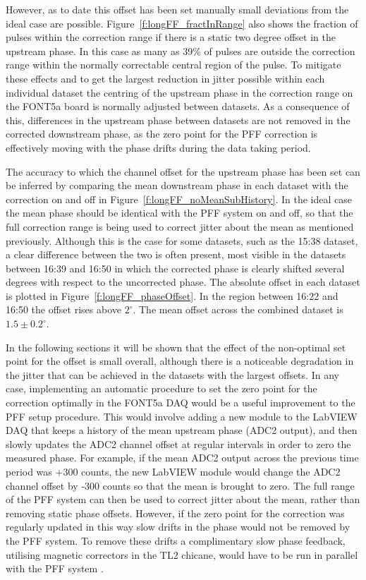 However, as to date this offset has been set manually small deviations from the ideal case are possible. Figure~\ref{f:longFF_fractInRange} also shows the fraction of pulses within the correction range if there is a static two degree offset in the upstream phase. In this case as many as 39\% of pulses are outside the correction range within the normally correctable central region of the pulse. To mitigate these effects and to get the largest reduction in jitter possible within each individual dataset the centring of the upstream phase in the correction range on the FONT5a board is normally adjusted between datasets. As a consequence of this, differences in the upstream phase between datasets are not removed in the corrected downstream phase, as the zero point for the PFF correction is effectively moving with the phase drifts during the data taking period. %

The accuracy to which the channel offset for the upstream phase has been set can be inferred by comparing the mean downstream phase in each dataset with the correction on  and off in Figure~\ref{f:longFF_noMeanSubHistory}. In the ideal case the mean phase should be identical with the PFF system on and off, so that the full correction range is being used to correct jitter about the mean as mentioned previously. Although this is the case for some datasets, such as the 15:38 dataset, a clear difference between the two is often present, most visible in the datasets between 16:39 and 16:50 in which the corrected phase is clearly shifted several degrees with respect to the uncorrected phase. The absolute offset in each dataset is plotted in Figure~\ref{f:longFF_phaseOffset}. In the region between 16:22 and 16:50 the offset rises above \(2^\circ\). The mean offset across the combined dataset is \(1.5\pm0.2^\circ\). 

In the following sections it will be shown that the effect of the non-optimal set point for the offset is small overall, although there is a noticeable degradation in the jitter that can be achieved in the datasets with the largest offsets. In any case, implementing an automatic procedure to set the zero point for the correction optimally in the FONT5a DAQ would be a useful improvement to the PFF setup procedure. This would involve adding a new module to the LabVIEW DAQ that keeps a history of the mean upstream phase (ADC2 output), and then slowly updates the ADC2 channel offset at regular intervals in order to zero the measured phase. For example, if the mean ADC2 output across the previous time period was +300 counts, the new LabVIEW module would change the ADC2 channel offset by -300 counts so that the mean is brought to zero. The full range of the PFF system can then be used to correct jitter about the mean, rather than removing static phase offsets. However, if the zero point for the correction was regularly updated in this way slow drifts in the phase would not be removed by the PFF system. To remove these drifts a complimentary slow phase feedback, utilising magnetic correctors in the TL2 chicane, would have to be run in parallel with the PFF system \cite{jackLCWS14}.

